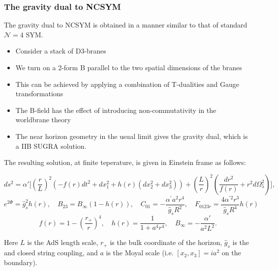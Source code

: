 \documentclass[8pt,aspectratio=169]{beamer}
\begin{document}
\begin{frame}
\frametitle{The gravity dual to NCSYM}

The gravity dual to NCSYM is obtained in a manner similar to that of standard $\mathcal{N} = 4$ SYM.

\begin{itemize}

\item Consider a stack of D3-branes

\item We turn on a 2-form B parallel to the two spatial dimensions of the branes

\item This can be achieved by applying a combination of T-dualities and Gauge transformations

\item The B-field has the effect of introducing non-commutativity in the worldbrane theory

\item The near horizon geometry in the usual limit gives the gravity dual, which is a IIB SUGRA solution.

\end{itemize}

The resulting solution, at finite teperature, is given in Einstein frame as follows:

\begin{equation}
ds^2 = \alpha' \bigg[ \left(\frac{r}{L}\right)^2
\left(- f(r) dt^2 + dx_1^2  + h(r) (dx_2^2 + dx_3^2)\right)
+\left(\frac{L}{r}\right)^2 \left(
\frac{dr^2}{f(r)} + r^2 d\Omega_5^2\right)\bigg],
\end{equation}
%
\begin{equation}
e^{2\Phi} = \hat{g}_s^2 h(r) ,\quad B_{23} = B_{\infty}(1-h(r)) ,\quad C_{01} = -\frac{\alpha^{\prime} a^2 r^4}{\hat{g}_s R^2} ,\quad F_{0123r} = \frac{4\alpha^{\prime 2} r^3}{\hat{g}_s R^4} h(r)
\end{equation}
%
\begin{equation}
f(r) = 1 - \left(\frac{r_+}{r}\right)^4 ,\quad h(r) = \frac{1}{1 + a^4 r^4} ,\quad B_{\infty} = -\frac{\alpha'}{a^2 L^2}. 
\end{equation}

Here $L$ is the AdS length scale, $r_+$ is the bulk coordinate of the horizon, $\hat{g}_s$ is the  and closed string coupling, and $a$ is the Moyal scale (i.e. $[x_2,x_3]= i a^2$ on the boundary).

\end{frame}
\end{document}
